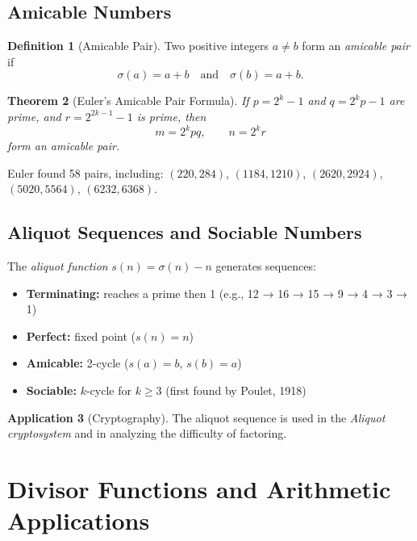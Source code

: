 \documentclass[11pt,a4paper,twoside]{book}
\theoremstyle{eulerstyle}
\newtheorem{theorem}{Theorem}[chapter]
\theoremstyle{definition}
\newtheorem{definition}[theorem]{Definition}
\newtheorem{application}[theorem]{Application}
\begin{document}
\section{Amicable Numbers}

\begin{definition}[Amicable Pair]
Two positive integers $a \neq b$ form an \emph{amicable pair} if
\[
\sigma(a) = a + b \quad \text{and} \quad \sigma(b) = a + b.
\]
\end{definition}

\begin{theorem}[Euler's Amicable Pair Formula]
If $p = 2^k - 1$ and $q = 2^k p - 1$ are prime, and $r = 2^{2k-1} - 1$ is prime, then
\[
m = 2^k p q, \qquad n = 2^k r
\]
form an amicable pair.
\end{theorem}

Euler found 58 pairs, including:
$(220, 284)$, $(1184, 1210)$, $(2620, 2924)$, $(5020, 5564)$, $(6232, 6368)$.

\section{Aliquot Sequences and Sociable Numbers}

The \emph{aliquot function} $s(n) = \sigma(n) - n$ generates sequences:
\begin{itemize}
    \item \textbf{Terminating:} reaches a prime then 1 (e.g., 12 → 16 → 15 → 9 → 4 → 3 → 1)
    \item \textbf{Perfect:} fixed point ($s(n) = n$)
    \item \textbf{Amicable:} 2-cycle ($s(a) = b$, $s(b) = a$)
    \item \textbf{Sociable:} $k$-cycle for $k \ge 3$ (first found by Poulet, 1918)
\end{itemize}

\begin{application}[Cryptography]
The aliquot sequence is used in the \emph{Aliquot cryptosystem} and in analyzing the difficulty of factoring.
\end{application}

\cleardoublepage

\chapter{Divisor Functions and Arithmetic Applications}
\label{ch:divisors}
\end{document}
